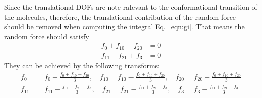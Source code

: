 \documentclass[aip,jcp,a4paper,reprint,onecolumn]{revtex4-1}
\begin{document}
Since the translational DOFs are note ralevant to the conformational
transition of the molecules, therefore, the translational contribution
of the random force should be removed when computing the integral
Eq.~\eqref{eqn:gi}. That means the random force should satisfy
\begin{align}\label{eqn:cond-trans-0}
  f_0 + f_{10} + f_{20} &= 0\\\label{eqn:cond-trans-1}
  f_{11} + f_{21} + f_3 &= 0
\end{align}
They can be achieved by the following transforms:
\begin{align}
  f_0 &= f_0 - \frac{f_0 + f_{10} + f_{20}}3,\quad 
  f_{10} = f_{10} - \frac{f_0 + f_{10} + f_{20}}3,\quad 
  f_{20} = f_{20} - \frac{f_0 + f_{10} + f_{20}}3\\
  f_{11} &= f_{11} - \frac{f_{11} + f_{21} + f_3}3,\quad 
  f_{21} = f_{21} - \frac{f_{11} + f_{21} + f_3}3,\quad 
  f_{3} = f_{3} - \frac{f_{11} + f_{21} + f_3}3
\end{align}
\end{document}
